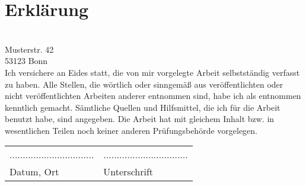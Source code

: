 \section*{Erklärung}
\ThesisAuthor \\
Musterstr. 42 \\
53123 Bonn \\
\newline
Ich versichere an Eides statt, die von mir vorgelegte Arbeit selbstständig verfasst zu
haben. Alle Stellen, die wörtlich oder sinngemäß aus veröffentlichten oder 
nicht veröffentlichten Arbeiten anderer entnommen sind, habe ich als entnommen 
kenntlich gemacht. Sämtliche Quellen und Hilfsmittel, die ich für die Arbeit benutzt habe, 
sind angegeben. Die Arbeit hat mit gleichem Inhalt bzw. in wesentlichen Teilen noch keiner 
anderen Prüfungsbehörde vorgelegen.
\newline


\begin{tabular}{ll}
................................ & ................................ \\ 
Datum, Ort & Unterschrift
\end{tabular}